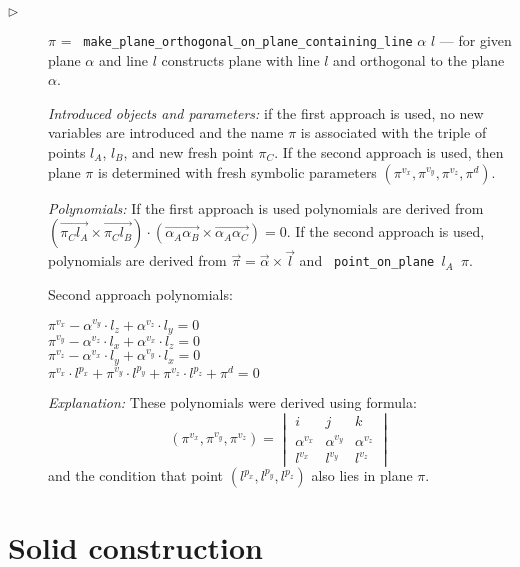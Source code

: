 \documentclass{article}
\begin{document}
\begin{description}
\item[$\triangleright$] $\pi$ = {\tt
    make\_plane\_orthogonal\_on\_plane\_containing\_line} $\alpha$ $l$
  --- for given plane $\alpha$ and line $l$ constructs plane with line
  $l$ and orthogonal to the plane $\alpha$.

  {\em Introduced objects and parameters:} if the first approach is
  used, no new variables are introduced and the name $\pi$ is
  associated with the triple of points $l_A$, $l_B$, and new fresh
  point $\pi_C$. If the second approach is used, then plane $\pi$ is
  determined with fresh symbolic parameters
  $(\pi^{v_x}, \pi^{v_y}, \pi^{v_z}, \pi^{d})$.

  {\em Polynomials:} If the first approach is used polynomials are
  derived from $(\overrightarrow{\pi_Cl_A} \times
  \overrightarrow{\pi_Cl_B}) \cdot (\overrightarrow{\alpha_A\alpha_B}
  \times \overrightarrow{\alpha_A\alpha_C}) = 0$. If the second
  approach is used, polynomials are derived from $\overrightarrow{\pi}
  = \overrightarrow{\alpha} \times \overrightarrow{l}$ and {\tt
    point\_on\_plane $l_A$ $\pi$}.

Second approach polynomials:
\begin{tabbing}
$\pi^{v_x} - \alpha^{v_y}\cdot l_z + \alpha^{v_z}\cdot l_y = 0$ \\
$\pi^{v_y} - \alpha^{v_z}\cdot l_x + \alpha^{v_x}\cdot l_z = 0$ \\
$\pi^{v_z} - \alpha^{v_x}\cdot l_y + \alpha^{v_y}\cdot l_x = 0$ \\
$\pi^{v_x}\cdot l^{p_x} + \pi^{v_y}\cdot l^{p_y} + \pi^{v_z}\cdot l^{p_z} + \pi^{d} = 0$
\end{tabbing}
{\em Explanation:} These polynomials were derived using formula:
$$ (\pi^{v_x}, \pi^{v_y}, \pi^{v_z}) = \begin{vmatrix}
i & j & k \\
\alpha^{v_x} & \alpha^{v_y} & \alpha^{v_z} \\
l^{v_x} & l^{v_y} & l^{v_z}
\end{vmatrix}
$$ and the condition that point $(l^{p_x}, l^{p_y}, l^{p_z})$ also
lies in plane $\pi$.
\end{description}


\section{Solid construction}
\end{document}
